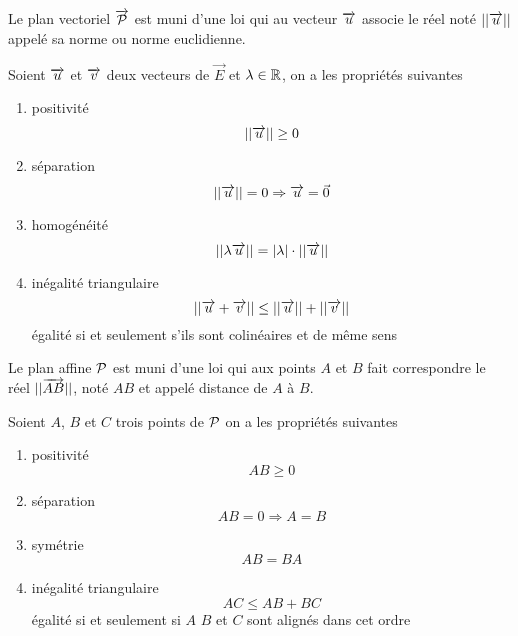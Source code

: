 Le plan vectoriel \(\vect{\P}\) est muni d'une loi qui au vecteur \(\vu\) associe le 
réel noté \(||\vu||\) appelé sa norme ou norme euclidienne.
\begin{prop}
  Soient \(\vu\) et \(\vv\) deux vecteurs de \(\vec{E}\) et \(\lambda \in \R\), on a les 
  propriétés suivantes
  \begin{enumerate}
    \item positivité
      \begin{equation}
        ||\vu|| \geq 0
      \end{equation}
    \item séparation
      \begin{equation}
        ||\vu|| = 0 \Rightarrow \vu = \vec{0}
      \end{equation}
    \item homogénéité
      \begin{equation}
        ||\lambda \vu||=|\lambda| \cdot ||\vu||
      \end{equation}
    \item inégalité triangulaire
      \begin{equation}
        ||\vu+\vv|| \leq ||\vu|| + ||\vv||
      \end{equation}
      égalité si et seulement s'ils sont colinéaires et de même sens
  \end{enumerate}
\end{prop}
Le plan affine \(\P\) est muni d'une loi qui aux points \(A\) et \(B\) fait 
correspondre le réel \(||\vect{AB}||\), noté \(AB\) et appelé distance de \(A\) à \(B\).
\begin{prop}
  Soient \(A\), \(B\) et \(C\) trois points de \(\P\) on a les propriétés suivantes
  \begin{enumerate}
    \item positivité
      \begin{equation}
        AB \geq 0
      \end{equation}
    \item séparation
      \begin{equation}
        AB = 0 \Rightarrow A=B
      \end{equation}
    \item symétrie
      \begin{equation}
        AB=BA
      \end{equation}
    \item inégalité triangulaire
      \begin{equation}
        AC \leq AB + BC
      \end{equation}
      égalité si et seulement si \(A\) \(B\) et \(C\) sont alignés dans cet ordre
  \end{enumerate}
\end{prop}

